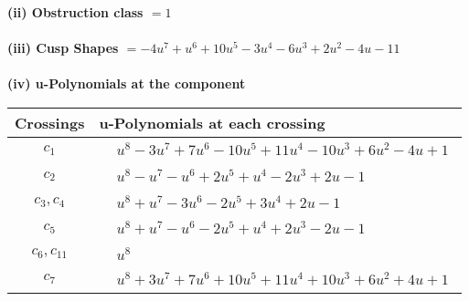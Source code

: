 \documentclass[1p]{elsarticle_modified}
\theoremstyle{definition}
\begin{document}
\flushleft \textbf{(ii) Obstruction class $= 1$}\\~\\
\flushleft \textbf{(iii) Cusp Shapes $= -4 u^7+u^6+10 u^5-3 u^4-6 u^3+2 u^2-4 u-11$}\\~\\
\newpage\renewcommand{\arraystretch}{1}
\flushleft \textbf{(iv) u-Polynomials at the component}\newline \\
\begin{tabular}{m{50pt}|m{274pt}}
Crossings & \hspace{64pt}u-Polynomials at each crossing \\
\hline $$\begin{aligned}c_{1}\end{aligned}$$&$\begin{aligned}
&u^8-3 u^7+7 u^6-10 u^5+11 u^4-10 u^3+6 u^2-4 u+1
\end{aligned}$\\
\hline $$\begin{aligned}c_{2}\end{aligned}$$&$\begin{aligned}
&u^8- u^7- u^6+2 u^5+u^4-2 u^3+2 u-1
\end{aligned}$\\
\hline $$\begin{aligned}c_{3},c_{4}\end{aligned}$$&$\begin{aligned}
&u^8+u^7-3 u^6-2 u^5+3 u^4+2 u-1
\end{aligned}$\\
\hline $$\begin{aligned}c_{5}\end{aligned}$$&$\begin{aligned}
&u^8+u^7- u^6-2 u^5+u^4+2 u^3-2 u-1
\end{aligned}$\\
\hline $$\begin{aligned}c_{6},c_{11}\end{aligned}$$&$\begin{aligned}
&u^8
\end{aligned}$\\
\hline $$\begin{aligned}c_{7}\end{aligned}$$&$\begin{aligned}
&u^8+3 u^7+7 u^6+10 u^5+11 u^4+10 u^3+6 u^2+4 u+1
\end{aligned}$\\

\end{tabular}
\end{document}
